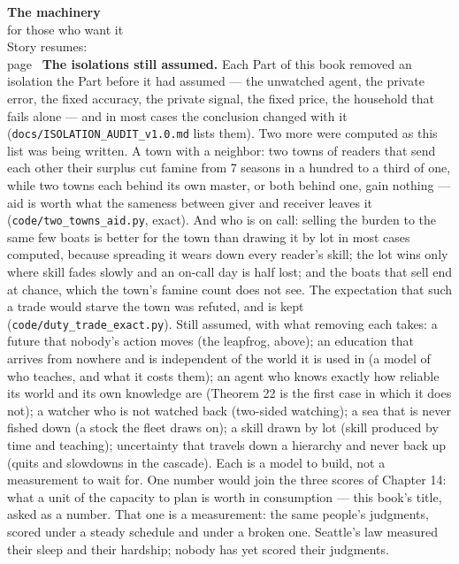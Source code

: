 \begin{machinery}{\textbf{The machinery}\\for those who want it\\[3pt]{\color{muted}Story resumes:\\page~\pageref{ch15-s5}}}
\textbf{The isolations still assumed.} Each Part of this book removed an
isolation the Part before it had assumed --- the unwatched agent, the
private error, the fixed accuracy, the private signal, the fixed
price, the household that fails alone --- and in most cases the
conclusion changed with it (\texttt{docs/\allowbreak{}ISOLATION\_\allowbreak{}AUDIT\_\allowbreak{}v1.\allowbreak{}0.\allowbreak{}md} lists
them). Two more were computed as this list was being written. A town
with a neighbor: two towns of readers
that send each other their surplus cut famine from 7 seasons in a
hundred to a third of one, while two towns each behind its own master,
or both behind one, gain nothing --- aid is worth what the sameness
between giver and receiver leaves it (\texttt{code/\allowbreak{}two\_\allowbreak{}towns\_\allowbreak{}aid.\allowbreak{}py}, exact).
And who is on call: selling the burden to the same few boats is better
for the town than drawing it by lot in most cases computed, because
spreading it wears down every reader's skill; the lot wins only where
skill fades slowly and an on-call day is half lost; and the boats that
sell end at chance, which the town's famine count does not see. The
expectation that such a trade would starve the town was refuted, and
is kept (\texttt{code/\allowbreak{}duty\_\allowbreak{}trade\_\allowbreak{}exact.\allowbreak{}py}). Still assumed, with what removing each takes: a
future that nobody's action moves (the leapfrog, above); an education
that arrives from nowhere and is independent of the world it is used
in (a model of who teaches, and what it costs them); an agent who
knows exactly how reliable its world and its own knowledge are
(Theorem 22 is the first case in which it does not); a watcher who is
not watched back (two-sided watching); a sea that is never fished down
(a stock the fleet draws on); a skill drawn by lot (skill produced by
time and teaching); uncertainty that travels down a hierarchy and
never back up (quits and slowdowns in the cascade). Each is a model to
build, not a measurement to wait for. One number would join the three
scores of Chapter 14: what a unit of the capacity to plan is worth in
consumption --- this book's title, asked as a number. That one is a
measurement: the same people's judgments, scored under a steady
schedule and under a broken one. Seattle's law measured their sleep
and their hardship; nobody has yet scored their judgments.



\end{machinery}
